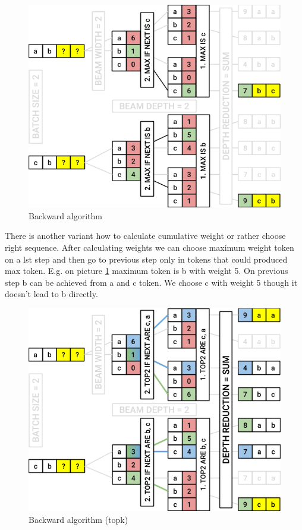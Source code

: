 \documentclass{article}
\begin{document}
\begin{figure}[H]
    \centering
    \includegraphics[width=1.0\linewidth]{beam_bkw.png}
    \caption{Backward algorithm}
    \label{fig:beam_bkw}
\end{figure}

There is another variant how to calculate cumulative weight or rather choose right sequence. After calculating weights we can choose maximum weight token on a lst step and then go to previous step only in tokens that could produced max token. E.g. on picture \ref{fig:beam_bkw} maximum token is b with weight 5. On previous step b can be achieved from a and c token. We choose c with weight 5 though it doesn't lead to b directly. 

\begin{figure}[H]
    \centering
    \includegraphics[width=1.0\linewidth]{beam_bkw_topk.png}
    \caption{Backward algorithm (topk)}
    \label{fig:beam}
\end{figure}
\end{document}
